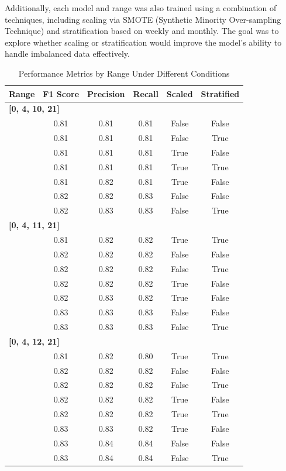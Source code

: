 			Additionally, each model and range was also trained using a combination of techniques, including
			scaling via SMOTE (Synthetic Minority Over-sampling Technique) and stratification based on weekly and
			monthly. The goal was to explore whether scaling or stratification would improve the model’s ability to
			handle imbalanced data effectively.

			\begin{table}[ht]
				\centering
				\small
				\begin{tabular}{|l|c|c|c|c|c|}
					\hline
					\textbf{Range} & \textbf{F1 Score} & \textbf{Precision} & \textbf{Recall} & \textbf{Scaled}
					& \textbf{Stratified}
					\\
					\hline
					\multicolumn{6}{|l|}{\textbf{[0, 4, 10, 21]}} \\
					\hline
					& 0.81 & 0.81 & 0.81 & False & False \\
					& 0.81 & 0.81 & 0.81 & False & True  \\
					& 0.81 & 0.81 & 0.81 & True  & False \\
					& 0.81 & 0.81 & 0.81 & True  & True  \\
					& 0.81 & 0.82 & 0.81 & True  & False \\
					& 0.82 & 0.82 & 0.83 & False & False \\
					& 0.82 & 0.83 & 0.83 & False & True  \\
					\hline
					\multicolumn{6}{|l|}{\textbf{[0, 4, 11, 21]}} \\
					\hline
					& 0.81 & 0.82 & 0.82 & True  & True  \\
					& 0.82 & 0.82 & 0.82 & False & False \\
					& 0.82 & 0.82 & 0.82 & False & True  \\
					& 0.82 & 0.82 & 0.82 & True  & False \\
					& 0.82 & 0.83 & 0.82 & True  & False \\
					& 0.83 & 0.83 & 0.83 & False & False \\
					& 0.83 & 0.83 & 0.83 & False & True  \\
					\hline
					\multicolumn{6}{|l|}{\textbf{[0, 4, 12, 21]}} \\
					\hline
					& 0.81 & 0.82 & 0.80 & True  & True  \\
					& 0.82 & 0.82 & 0.82 & False & False \\
					& 0.82 & 0.82 & 0.82 & False & True  \\
					& 0.82 & 0.82 & 0.82 & True  & False \\
					& 0.82 & 0.82 & 0.82 & True  & True  \\
					& 0.83 & 0.83 & 0.82 & True  & False \\
					& 0.83 & 0.84 & 0.84 & False & False \\
					& 0.83 & 0.84 & 0.84 & False & True  \\
					\hline
				\end{tabular}
				\caption{Performance Metrics by Range Under Different Conditions}
				\label{tab:bins-performance-conditions}
			\end{table}



